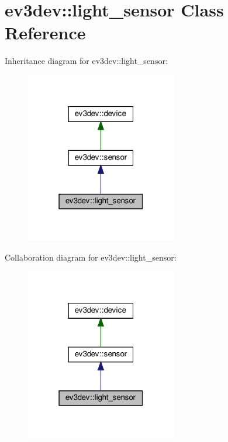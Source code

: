 \hypertarget{classev3dev_1_1light__sensor}{}\section{ev3dev\+:\+:light\+\_\+sensor Class Reference}
\label{classev3dev_1_1light__sensor}


Inheritance diagram for ev3dev\+:\+:light\+\_\+sensor\+:
\nopagebreak
\begin{figure}[H]
\begin{center}
\leavevmode
\includegraphics[width=187pt]{classev3dev_1_1light__sensor__inherit__graph}
\end{center}
\end{figure}


Collaboration diagram for ev3dev\+:\+:light\+\_\+sensor\+:
\nopagebreak
\begin{figure}[H]
\begin{center}
\leavevmode
\includegraphics[width=187pt]{classev3dev_1_1light__sensor__coll__graph}
\end{center}
\end{figure}
